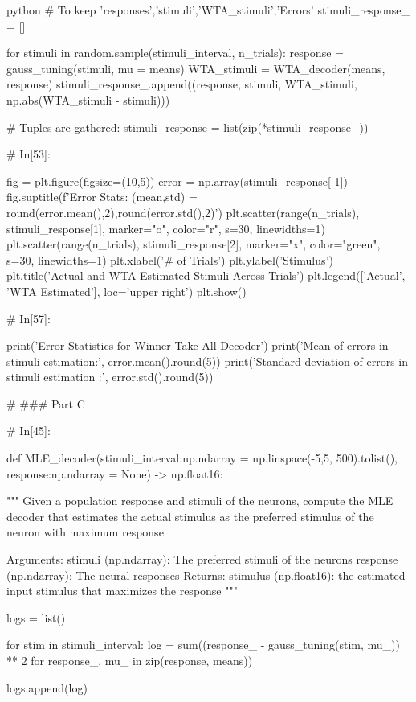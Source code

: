 \documentclass[12pt]{amsart}
\begin{document}
\begin{mintedbox}{python}
# To keep 'responses','stimuli','WTA_stimuli','Errors'
stimuli_response_ = []

for stimuli in random.sample(stimuli_interval, n_trials):
    response = gauss_tuning(stimuli, mu = means)
    WTA_stimuli = WTA_decoder(means, response)
    stimuli_response_.append((response, stimuli, WTA_stimuli, np.abs(WTA_stimuli - stimuli)))
 
# Tuples are gathered:
stimuli_response = list(zip(*stimuli_response_))


# In[53]:


fig = plt.figure(figsize=(10,5))
error = np.array(stimuli_response[-1])
fig.suptitle(f'Error Stats: (mean,std) = {round(error.mean(),2),round(error.std(),2)}')
plt.scatter(range(n_trials), stimuli_response[1], marker="o", color="r", s=30, linewidths=1)
plt.scatter(range(n_trials), stimuli_response[2], marker="x", color="green", s=30, linewidths=1)
plt.xlabel('# of Trials')
plt.ylabel('Stimulus')
plt.title('Actual and WTA Estimated Stimuli Across Trials')
plt.legend(['Actual', 'WTA Estimated'], loc='upper right')
plt.show()


# In[57]:


print('Error Statistics for Winner Take All Decoder')
print('Mean of errors in stimuli estimation:', error.mean().round(5))
print('Standard deviation of errors in stimuli estimation :', error.std().round(5))


# ### Part C

# In[45]:


def MLE_decoder(stimuli_interval:np.ndarray = np.linspace(-5,5, 500).tolist(),
                response:np.ndarray = None) -> np.float16:
     
    """
    Given a population response and  stimuli of the
    neurons, compute the MLE decoder that 
    estimates the actual stimulus as the preferred
    stimulus of the neuron with maximum response

        Arguments:
            stimuli  (np.ndarray): The preferred stimuli of the neurons
            response (np.ndarray): The neural responses
        Returns:
            stimulus (np.float16): the estimated input stimulus that maximizes the response
    """


    logs = list()

    for stim in stimuli_interval:
        log = sum((response_ - gauss_tuning(stim, mu_)) ** 2 for response_, mu_ in zip(response, means)) 
           
        logs.append(log)


\end{mintedbox}
\end{document}
